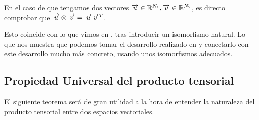 \begin{ejemplo}
    En el caso de que tengamos dos vectores $\overrightarrow{u} \in \mathbb{R}^{N_1}, \overrightarrow{v} \in \mathbb{R}^{N_2}$, es directo comprobar que $\overrightarrow{u} \otimes \overrightarrow{v} = \overrightarrow{u} \overrightarrow{v}^T$.

    Esto coincide con lo que vimos en , tras introducir un isomorfismo natural. Lo que nos muestra que podemos tomar el desarrollo realizado en  y conectarlo con este desarrollo mucho más concreto, usando unos isomorfismos adecuados.
\end{ejemplo}

\subsection{Propiedad Universal del producto tensorial}

El siguiente teorema será de gran utilidad a la hora de entender la naturaleza del producto tensorial entre dos espacios vectoriales.

